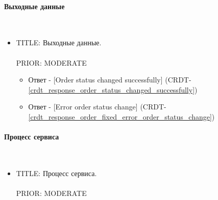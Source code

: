   \paragraph{Выходные данные} \mbox{} \\

    \begin{itemize}

      \item{

        TITLE: Выходные данные.\\
        \\
        PRIOR: MODERATE\\

      }

        \begin{itemize}
          \item Ответ - [Order status changed successfully] (CRDT-\ref{crdt_response_order_status_changed_successfully})
          \item Ответ - [Error order status change] (CRDT-\ref{crdt_response_order_fixed_error_order_status_change})
        \end{itemize}

      \end{itemize}

  \paragraph{Процесс сервиса} \mbox{} \\

    \begin{itemize}

         \item {
           TITLE: Процесс сервиса.\\
           \\
           PRIOR: MODERATE\\
         }

         \end{itemize}


